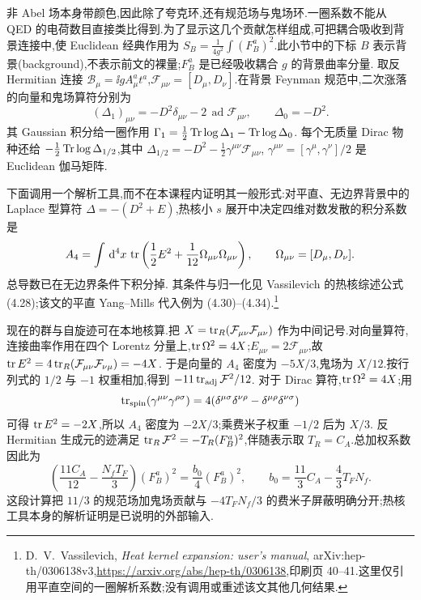 非 Abel 场本身带颜色,因此除了夸克环,还有规范场与鬼场环.一圈系数不能从 QED 的电荷数目直接类比得到.为了显示这几个贡献怎样组成,可把耦合吸收到背景连接中,使 Euclidean 经典作用为
$S_B=\tfrac1{4g^2}\int(F_B^a)^2$.此小节中的下标 $B$ 表示背景(background),不表示前文的裸量;$F_B^a$ 是已经吸收耦合 $g$ 的背景曲率分量.
取反 Hermitian 连接 $\mathcal B_\mu=\ii gA_\mu^at^a$,$\mathcal F_{\mu\nu}=[D_\mu,D_\nu]$.在背景 Feynman 规范中,二次涨落的向量和鬼场算符分别为
\begin{equation}
 (\Delta_1)_{\mu\nu}=-D^2\delta_{\mu\nu}-2\,\operatorname{ad}\mathcal F_{\mu\nu},
 \qquad \Delta_0=-D^2.
\end{equation}
其 Gaussian 积分给一圈作用
$\Gamma_1=\tfrac12\operatorname{Tr}\log\Delta_1-\operatorname{Tr}\log\Delta_0$.
每个无质量 Dirac 物种还给
$-\tfrac12\operatorname{Tr}\log\Delta_{1/2}$,其中
$\Delta_{1/2}=-D^2-\tfrac12\gamma^{\mu\nu}\mathcal F_{\mu\nu}$,
$\gamma^{\mu\nu}=[\gamma^\mu,\gamma^\nu]/2$ 是 Euclidean 伽马矩阵.

下面调用一个解析工具,而不在本课程内证明其一般形式:对平直、无边界背景中的 Laplace 型算符
$\Delta=-(D^2+E)$,热核小 $s$ 展开中决定四维对数发散的积分系数是
\begin{equation}
 A_4=\int\,\mathrm d^4x\,\operatorname{tr}\left(\frac12E^2+
                  \frac1{12}\Omega_{\mu\nu}\Omega_{\mu\nu}\right),
 \qquad \Omega_{\mu\nu}=[D_\mu,D_\nu].
 \label{eq:qcd-heat-kernel-tool}
\end{equation}
总导数已在无边界条件下积分掉.
其条件与归一化见 Vassilevich 的热核综述公式 (4.28);该文的平直 Yang--Mills 代入例为 (4.30)--(4.34).\footnote{D.~V.~Vassilevich, \emph{Heat kernel expansion: user's manual}, arXiv:hep-th/0306138v3,\url{https://arxiv.org/abs/hep-th/0306138},印刷页 40--41.这里仅引用平直空间的一圈解析系数;没有调用或重述该文其他几何结果.}

现在的群与自旋迹可在本地核算.把 $X=\operatorname{tr}_R(\mathcal F_{\mu\nu}\mathcal F_{\mu\nu})$ 作为中间记号.对向量算符,连接曲率作用在四个 Lorentz 分量上,$\operatorname{tr}\Omega^2=4X$;$E_{\mu\nu}=2\mathcal F_{\mu\nu}$,故
$\operatorname{tr} E^2=4\operatorname{tr}_R(\mathcal F_{\mu\nu}\mathcal F_{\nu\mu})=-4X$.
于是向量的 $A_4$ 密度为 $-5X/3$,鬼场为 $X/12$.按行列式的 $1/2$ 与 $-1$ 权重相加,得到
$-11\operatorname{tr}_{\rm adj}\mathcal F^2/12$.
对于 Dirac 算符,$\operatorname{tr}\Omega^2=4X$;用
\begin{equation}
 \operatorname{tr}_{\rm spin}(\gamma^{\mu\nu}\gamma^{\rho\sigma})
 =4(\delta^{\mu\sigma}\delta^{\nu\rho}
             -\delta^{\mu\rho}\delta^{\nu\sigma})
\end{equation}
可得 $\operatorname{tr} E^2=-2X$,所以 $A_4$ 密度为 $-2X/3$;乘费米子权重 $-1/2$ 后为 $X/3$.
反 Hermitian 生成元的迹满足
$\operatorname{tr}_R\mathcal F^2=-T_R(F_B^a)^2$,伴随表示取 $T_R=C_A$.总加权系数因此为
\begin{equation}
 \left(\frac{11C_A}{12}-\frac{N_fT_F}{3}\right)(F_B^a)^2
       =\frac{b_0}{4}(F_B^a)^2,\qquad
 b_0=\frac{11}{3}C_A-\frac43T_FN_f.
 \label{eq:qcd-b0-trace-computation}
\end{equation}
这段计算把 $11/3$ 的规范场加鬼场贡献与 $-4T_FN_f/3$ 的费米子屏蔽明确分开;热核工具本身的解析证明是已说明的外部输入.

